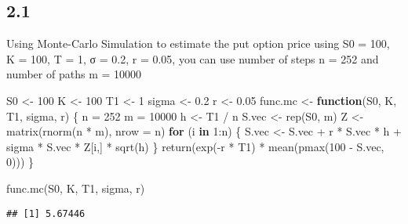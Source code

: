 \documentclass[
]{article}
\newenvironment{Shaded}{\begin{snugshade}}{\end{snugshade}}
\newcommand{\AttributeTok}[1]{\textcolor[rgb]{0.77,0.63,0.00}{#1}}
\newcommand{\ControlFlowTok}[1]{\textcolor[rgb]{0.13,0.29,0.53}{\textbf{#1}}}
\newcommand{\DecValTok}[1]{\textcolor[rgb]{0.00,0.00,0.81}{#1}}
\newcommand{\FloatTok}[1]{\textcolor[rgb]{0.00,0.00,0.81}{#1}}
\newcommand{\FunctionTok}[1]{\textcolor[rgb]{0.00,0.00,0.00}{#1}}
\newcommand{\NormalTok}[1]{#1}
\newcommand{\OtherTok}[1]{\textcolor[rgb]{0.56,0.35,0.01}{#1}}
\newcommand{\SpecialCharTok}[1]{\textcolor[rgb]{0.00,0.00,0.00}{#1}}
\begin{document}
\hypertarget{section-5}{%
\subsection{2.1}\label{section-5}}

Using Monte-Carlo Simulation to estimate the put option price using S0 =
100, K = 100, T = 1, σ = 0.2, r = 0.05, you can use number of steps n =
252 and number of paths m = 10000

\begin{Shaded}
\begin{Highlighting}[]
\NormalTok{S0 }\OtherTok{\textless{}{-}} \DecValTok{100}
\NormalTok{K }\OtherTok{\textless{}{-}} \DecValTok{100}
\NormalTok{T1 }\OtherTok{\textless{}{-}} \DecValTok{1}
\NormalTok{sigma }\OtherTok{\textless{}{-}} \FloatTok{0.2}
\NormalTok{r }\OtherTok{\textless{}{-}} \FloatTok{0.05}
\NormalTok{func.mc }\OtherTok{\textless{}{-}} \ControlFlowTok{function}\NormalTok{(S0, K, T1, sigma, r) \{}
\NormalTok{  n }\OtherTok{=} \DecValTok{252}
\NormalTok{  m }\OtherTok{=} \DecValTok{10000}
\NormalTok{  h }\OtherTok{\textless{}{-}}\NormalTok{ T1 }\SpecialCharTok{/}\NormalTok{ n}
\NormalTok{  S.vec }\OtherTok{\textless{}{-}} \FunctionTok{rep}\NormalTok{(S0, m)}
\NormalTok{  Z }\OtherTok{\textless{}{-}} \FunctionTok{matrix}\NormalTok{(}\FunctionTok{rnorm}\NormalTok{(n }\SpecialCharTok{*}\NormalTok{ m), }\AttributeTok{nrow =}\NormalTok{ n)}
  \ControlFlowTok{for}\NormalTok{ (i }\ControlFlowTok{in} \DecValTok{1}\SpecialCharTok{:}\NormalTok{n) \{}
\NormalTok{  S.vec }\OtherTok{\textless{}{-}}\NormalTok{ S.vec }\SpecialCharTok{+}\NormalTok{ r }\SpecialCharTok{*}\NormalTok{ S.vec }\SpecialCharTok{*}\NormalTok{ h }\SpecialCharTok{+}\NormalTok{ sigma }\SpecialCharTok{*}\NormalTok{ S.vec }\SpecialCharTok{*}\NormalTok{ Z[i,] }\SpecialCharTok{*} \FunctionTok{sqrt}\NormalTok{(h)}
\NormalTok{  \}}
  \FunctionTok{return}\NormalTok{(}\FunctionTok{exp}\NormalTok{(}\SpecialCharTok{{-}}\NormalTok{r }\SpecialCharTok{*}\NormalTok{ T1) }\SpecialCharTok{*} \FunctionTok{mean}\NormalTok{(}\FunctionTok{pmax}\NormalTok{(}\DecValTok{100} \SpecialCharTok{{-}}\NormalTok{ S.vec, }\DecValTok{0}\NormalTok{)))}
\NormalTok{\}}

\FunctionTok{func.mc}\NormalTok{(S0, K, T1, sigma, r)}
\end{Highlighting}
\end{Shaded}

\begin{verbatim}
## [1] 5.67446
\end{verbatim}
\end{document}
